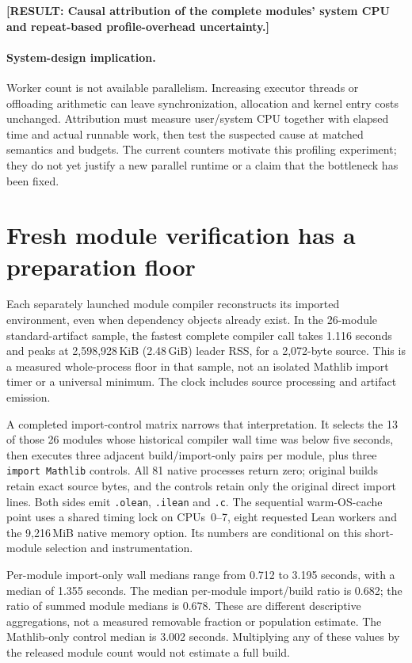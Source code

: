 \documentclass[10pt,twocolumn]{article}
\newcommand{\missing}[1]{\textbf{[RESULT: #1]}}
\begin{document}
\missing{Causal attribution of the complete modules' system CPU and
repeat-based profile-overhead uncertainty.}

\paragraph{System-design implication.}
Worker count is not available parallelism. Increasing executor threads or
offloading arithmetic can leave synchronization, allocation and kernel
entry costs unchanged. Attribution must measure user/system CPU together
with elapsed time and actual runnable work, then test the suspected cause
at matched semantics and budgets.
The current counters motivate this profiling experiment; they do not yet
justify a new parallel runtime or a claim that the bottleneck has been fixed.

\section{Fresh module verification has a preparation floor}
\label{sec:imports}
Each separately launched module compiler reconstructs its imported
environment, even when dependency objects already exist.
In the 26-module standard-artifact sample, the fastest complete compiler
call takes 1.116 seconds and peaks at 2,598,928\,KiB
(2.48\,GiB) leader RSS, for a 2,072-byte source.
This is a measured whole-process floor in that sample, not an isolated
Mathlib import timer or a universal minimum.
The clock includes source processing and artifact emission.

A completed import-control matrix narrows that interpretation.
It selects the 13 of those 26 modules whose historical compiler wall time
was below five seconds, then executes three adjacent build/import-only
pairs per module, plus three \texttt{import Mathlib} controls.
All 81 native processes return zero; original builds retain exact source
bytes, and the controls retain only the original direct import lines.
Both sides emit \texttt{.olean}, \texttt{.ilean} and \texttt{.c}.
The sequential warm-OS-cache point uses a shared timing lock on CPUs~0--7,
eight requested Lean workers and the 9,216\,MiB native memory option.
Its numbers are conditional on this short-module selection and instrumentation.

Per-module import-only wall medians range from 0.712 to 3.195 seconds,
with a median of 1.355 seconds. The median per-module import/build ratio
is 0.682; the ratio of summed module medians is 0.678.
These are different descriptive aggregations, not a measured removable
fraction or population estimate. The Mathlib-only control median is
3.002 seconds. Multiplying any of these values by the released module
count would not estimate a full build.
\end{document}
